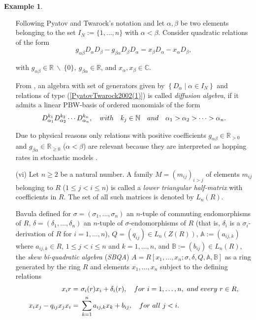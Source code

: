\documentclass{amsart}
\theoremstyle{definition}
\newtheorem{example}[theorem]{Example}
\theoremstyle{remark}
\numberwithin{equation}{section}
\begin{document}
\begin{example}
\begin{enumerate}
Following Pyatov and Twarock's notation and let $\alpha, \beta$ be two elements belonging to the set $I_N := \{1, \dotsc, n\}$ with $\alpha < \beta$. Consider quadratic relations of the form
\begin{equation}\label{PyatovTwarock2002(1)}
    g_{\alpha \beta} D_{\alpha} D_{\beta} - g_{\beta \alpha} D_{\beta} D_{\alpha} = x_{\beta} D_{\alpha} - x_{\alpha} D_{\beta},
\end{equation}

with $g_{\alpha \beta} \in \mathbb{R} \ \backslash \ \{0\}, \ g_{\beta \alpha} \in \mathbb{R}$, and $x_{\alpha}, x_{\beta} \in \mathbb{C}$.

From \cite[Definition 1.1]{PyatovTwarock2002}, an algebra with set of generators given by $\left\{ D_{\alpha} \mid \alpha \in I_N\right\}$ and relations of type {\rm (}\ref{PyatovTwarock2002(1)}{\rm )} is called {\em diffusion algebra}, if it admits a linear PBW-basis of ordered monomials of the form
\begin{equation}\label{PyatovTwarock2002(2)}
    D_{\alpha_1}^{k_1} D_{\alpha_2}^{k_2} \dotsb D_{\alpha_n}^{k_n},\quad {\rm with} \quad k_j \in \mathbb{N} \quad {\rm and} \quad \alpha_1 > \alpha_2 > \dotsb > \alpha_n.
\end{equation}

Due to physical reasons only relations with positive coefficients $g_{\alpha \beta} \in \mathbb{R}_{>0}$ and $g_{\beta \alpha} \in \mathbb{R}_{\ge 0}$ ($\alpha < \beta$) are relevant because they are interpreted as hopping rates in stochastic models \cite[p. 3268]{PyatovTwarock2002}.

\item [\rm (vi)] Let $n\ge 2$ be a natural number. A family $M = (m_{ij})_{i > j}$ of elements $m_{ij}$ belonging to $R$ ($1\le j < i \le n$) is called a {\em lower triangular half-matrix} with coefficients in $R$. The set of all such matrices is denoted by $L_n(R)$.

Bavula \cite[Section 1]{Bavula2023} defined for $\sigma = (\sigma_1, \dotsc, \sigma_n)$ an $n$-tuple of commuting endomorphisms of $R$, $\delta = (\delta_1, \dotsc, \delta_n)$ an $n$-tuple of $\sigma$-endomorphisms of $R$ (that is, $\delta_i$ is a $\sigma_i$-derivation of $R$ for $i=1,\dotsc, n$), $Q = (q_{ij})\in L_n(Z(R))$, $\mathbb{A}:= (a_{ij, k})$ where $a_{ij, k}\in R$, $1\le j < i \le n$ and $k = 1,\dotsc, n$, and $\mathbb{B}:= (b_{ij})\in L_n(R)$, the {\em skew bi-quadratic algebra} ({\em SBQA}) $A = R[x_1,\dotsc, x_n;\sigma, \delta, Q, \mathbb{A}, \mathbb{B}]$ as a ring generated by the ring $R$ and elements $x_1, \dotsc, x_n$ subject to the defining relations
\begin{align}
    x_ir = &\ \sigma_i(r)x_i + \delta_i(r),\quad {\rm for}\ i = 1, \dotsc, n,\ {\rm and\ every}\ r\in R, \label{Bavula2023(1)} \\
    x_ix_j - q_{ij}x_jx_i = &\ \sum_{k=1}^{n} a_{ij, k}x_k + b_{ij},\quad {\rm for\ all}\ j < i.\label{Bavula2023(2)}
\end{align}


\end{enumerate}
\end{example}
\end{document}

